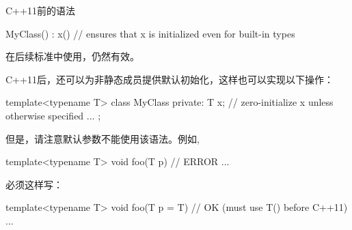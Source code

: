 C++11前的语法

\begin{cpp}
MyClass() : x() { // ensures that x is initialized even for built-in types
}
\end{cpp}

在后续标准中使用，仍然有效。

C++11后，还可以为非静态成员提供默认初始化，这样也可以实现以下操作：

\begin{cpp}
template<typename T>
class MyClass {
private:
	T x{}; // zero-initialize x unless otherwise specified
	...
};
\end{cpp}

但是，请注意默认参数不能使用该语法。例如,

\begin{cpp}
template<typename T>
void foo(T p{}) { // ERROR
	...
}
\end{cpp}

必须这样写：

\begin{cpp}
template<typename T>
void foo(T p = T{}) { // OK (must use T() before C++11)
	...
}
\end{cpp}





















